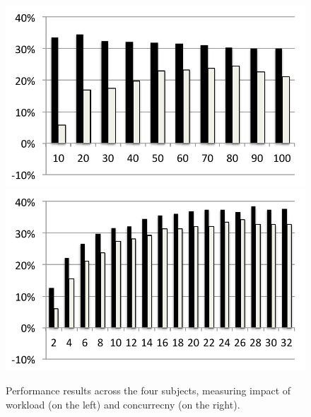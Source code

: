 \begin{figure}
  \medskip
  \includegraphics[width=\mywidth]{../../eval/32threads/case4it.pdf}\includegraphics[width=\mywidth]{../../eval/32threads/case4th.pdf}
  \caption{\label{fig:perf} Performance results across the four subjects, measuring impact of
    workload (on the left) and concurrecny (on the right).}
\end{figure}




